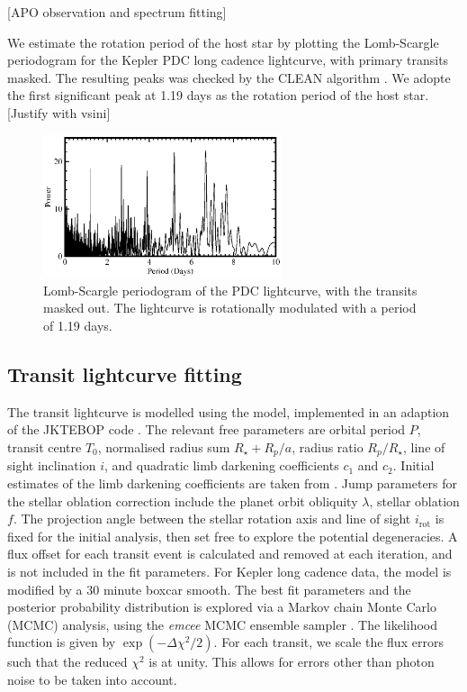 \documentclass[preprint]{emulateapj}
\begin{document}
[APO observation and spectrum fitting]

We estimate the rotation period of the host star by plotting the
Lomb-Scargle periodogram
\citep[][Figure~\ref{fig:LS}]{1976Ap&amp;SS..39..447L,1982ApJ...263..835S}
for the Kepler PDC long cadence lightcurve, with primary transits masked. The
resulting peaks was checked by the CLEAN algorithm
\citep{1987AJ.....93..968R}. We adopte the first significant peak at 1.19 
days as the rotation period of the host star. [Justify with vsini]

\begin{figure}[h!]
  \centering
  \includegraphics[width=7cm]{LS.eps}
  \caption{Lomb-Scargle periodogram of the PDC lightcurve, with the
    transits masked out. The lightcurve is rotationally modulated with
  a period of 1.19 days.}
  \label{fig:LS}
\end{figure}

\subsection{Transit lightcurve fitting}
\label{sec:transit-light-curve}

The transit lightcurve is modelled using the
\citet{1972ApJ...174..617N} model, implemented in an adaption of the
JKTEBOP code \citep{1981AJ.....86..102P,2004MNRAS.351.1277S}. The
relevant free parameters are orbital period $P$, transit centre $T_0$,
normalised radius sum $R_\star+R_p / a$, radius ratio $R_p/R_\star$,
line of sight inclination $i$, and quadratic limb darkening
coefficients $c_1$ and $c_2$. Initial estimates of the limb darkening
coefficients are taken from \citet{2010A&amp;A...510A..21S}. Jump
parameters for the stellar oblation correction include the planet
orbit obliquity $\lambda$, stellar oblation $f$. The projection angle
between the stellar rotation axis and line of sight $i_\text{rot}$ is
fixed for the initial analysis, then set free to explore the potential
degeneracies. A flux offset for each transit event is calculated and
removed at each iteration, and is not included in the fit
parameters. For Kepler long cadence data, the model is modified by a
30 minute boxcar smooth. The best fit parameters and the posterior
probability distribution is explored via a Markov chain Monte Carlo
(MCMC) analysis, using the \emph{emcee} MCMC ensemble sampler
\citep{2012arXiv1202.3665F}. The likelihood function is given by
$\exp(-\Delta\chi^2/2)$. For each transit, we scale the flux errors such
that the reduced $\chi^2$ is at unity. This allows for errors other
than photon noise to be taken into account.
\end{document}
